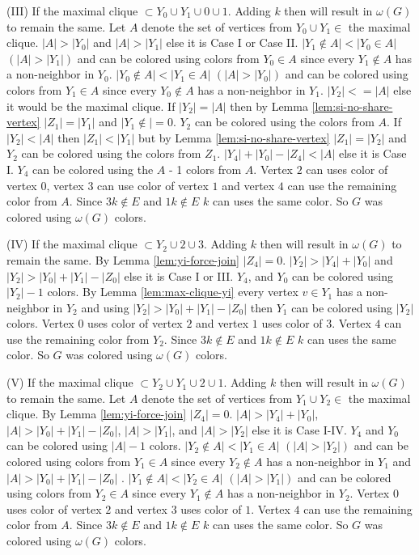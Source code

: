 \documentclass[12pt]{article}
\begin{document}
{(III) If the maximal clique $\subset Y_0 \cup Y_1 \cup 0 \cup 1$. Adding $k$ then will result in $\omega(G)$ to remain the same. Let $A$ denote the set of vertices from $Y_0 \cup Y_1 \in$ the maximal clique. $|A| > |Y_0|$ and $|A| > |Y_1|$ else it is Case I or Case II. $|Y_1 \not\in A| < |Y_0 \in A|$ $(|A| > |Y_1|)$ and can be colored using colors from $Y_0 \in A$ since every $Y_1 \not \in A$ has a non-neighbor in $Y_0$. $|Y_0 \not\in A| < |Y_1 \in A|$ $(|A| > |Y_0|)$ and can be colored using colors from $Y_1 \in A$ since every $Y_0 \not \in A$ has a non-neighbor in $Y_1$. 
$|Y_2| <= |A|$ else it would be the maximal clique.  If $|Y_2| = |A|$ then by Lemma \ref{lem:si-no-share-vertex} $|Z_1| = |Y_1|$ and $|Y_1 \not \in| = 0$. $Y_2$ can be colored using the colors from $A$. If $|Y_2| < |A|$ then $|Z_1| < |Y_1|$ but by Lemma \ref{lem:si-no-share-vertex} $|Z_1| = |Y_2|$ and $Y_2$ can be colored using the colors from $Z_1$. $|Y_4| + |Y_0| - |Z_4| < |A|$ else it is Case I. $Y_4$ can be colored using the $A$ - 1 colors from $A$. Vertex $2$ can uses color of vertex $0$, vertex $3$ can use color of vertex $1$  and vertex $4$ can use the remaining color from $A$. Since $3k \not \in E$ and $1k \not \in E$ $k$ can uses the same color. So $G$ was colored using $\omega(G)$ colors.

(IV) If the maximal clique $\subset Y_2 \cup 2 \cup 3$. Adding $k$ then will result in $\omega(G)$ to remain the same. By Lemma \ref{lem:yi-force-join} $|Z_4| = 0$. $|Y_2| > |Y_4| + |Y_0|$ and $|Y_2| > |Y_0| + |Y_1| - |Z_0|$ else it is Case I or III.  $Y_4$, and $Y_0$ can be colored using $|Y_2| - 1$ colors. By Lemma \ref{lem:max-clique-yi} every vertex $v \in Y_1$ has a non-neighbor in $Y_2$ and using $|Y_2| > |Y_0| + |Y_1| - |Z_0|$ then $Y_1$ can be colored using $|Y_2|$ colors. Vertex $0$ uses color of vertex $2$ and vertex $1$ uses color of $3$. Vertex $4$ can use the remaining color from $Y_2$. Since $3k \not \in E$ and $1k \not \in E$ $k$ can uses the same color. So $G$ was colored using $\omega(G)$ colors.

(V) If the maximal clique $\subset Y_2 \cup Y_1 \cup 2 \cup 1$. Adding $k$ then will result in $\omega(G)$ to remain the same. Let $A$ denote the set of vertices from $Y_1 \cup Y_2 \in$ the maximal clique. By Lemma \ref{lem:yi-force-join} $|Z_4| = 0$.  $|A| > |Y_4| + |Y_0|$, $|A| > |Y_0| + |Y_1| - |Z_0|$, $|A| > |Y_1|$, and $|A| > |Y_2|$ else it is Case I-IV.  $Y_4$ and $Y_0$ can be colored using $|A| - 1$ colors.
$|Y_2 \not\in A| < |Y_1 \in A|$ $(|A| > |Y_2|)$ and can be colored using colors from $Y_1 \in A$ since every $Y_2 \not \in A$ has a non-neighbor in $Y_1$ and $|A| > |Y_0| + |Y_1| - |Z_0|$ . $|Y_1 \not\in A| < |Y_2 \in A|$ $(|A| > |Y_1|)$ and can be colored using colors from $Y_2 \in A$ since every $Y_1\not \in A$ has a non-neighbor in $Y_2$. Vertex $0$ uses color of vertex $2$ and vertex $3$ uses color of $1$. Vertex $4$ can use the remaining color from $A$. Since $3k \not \in E$ and $1k \not \in E$ $k$ can uses the same color. So $G$ was colored using $\omega(G)$ colors.

}
\end{document}
